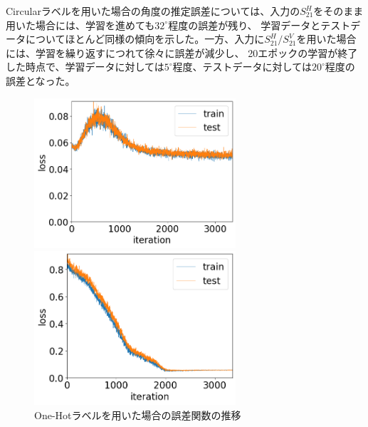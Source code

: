 \documentclass[11pt,a4paper,uplatex]{ujarticle}
\begin{document}
  Circularラベルを用いた場合の角度の推定誤差については、入力の$S_21^H$をそのまま用いた場合には、学習を進めても$32^{\circ}$程度の誤差が残り、
  学習データとテストデータについてほとんど同様の傾向を示した。一方、入力に$S_21^H/S_21^V$を用いた場合には、学習を繰り返すにつれて徐々に誤差が減少し、
  20エポックの学習が終了した時点で、学習データに対しては$5^{\circ}$程度、テストデータに対しては$20^{\circ}$程度の誤差となった。

  \clearpage
  \begin{figure}[tbp]
    \begin{minipage}[b]{0.495\textwidth}
      \centering
      \includegraphics[keepaspectratio, width=75mm]{Images/python/loss_202402051754.png}
    \end{minipage}
    \begin{minipage}[b]{0.495\textwidth}
      \centering
      \includegraphics[keepaspectratio, width=75mm]{Images/python/loss_202402052233.png}
    \end{minipage}
    \caption{One-Hotラベルを用いた場合の誤差関数の推移}
    \label{fig:loss_onehot}
  \end{figure}
\end{document}
